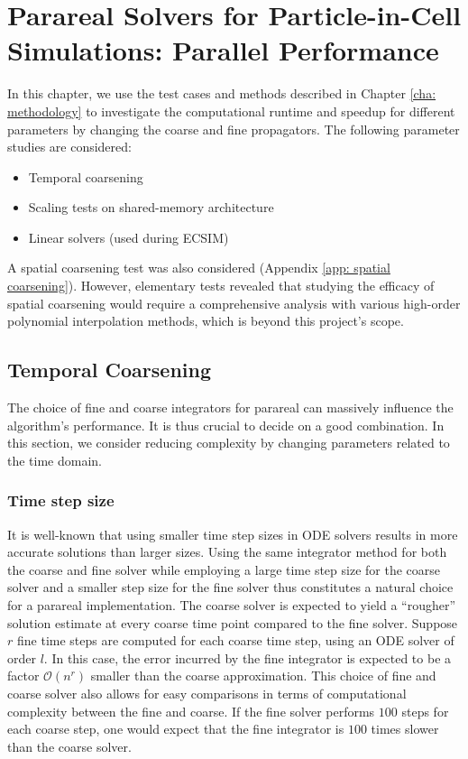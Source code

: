 \chapter{Parareal Solvers for Particle-in-Cell Simulations: Parallel Performance}
\label{cha: speedup}

In this chapter, we use the test cases and methods described in Chapter \ref{cha: methodology} to investigate the computational runtime and speedup for different parameters by changing the coarse and fine propagators. 
 The following parameter studies are considered: 
 \begin{itemize}
 
    \item Temporal coarsening
    
    \item Scaling tests on shared-memory architecture
    
    \item Linear solvers (used during ECSIM)
 
 \end{itemize}
A spatial coarsening test was also considered (Appendix \ref{app: spatial coarsening}). However, elementary tests revealed that studying the efficacy of spatial coarsening would require a comprehensive analysis with various high-order polynomial interpolation methods, which is beyond this project's scope. 

\section{Temporal Coarsening}
The choice of fine and coarse integrators for parareal can massively influence the algorithm's performance. It is thus crucial to decide on a good combination. In this section, we consider reducing complexity by changing parameters related to the time domain.
\subsection{Time step size}
 It is well-known that using smaller time step sizes in ODE solvers results in more accurate solutions than larger sizes. Using the same integrator method for both the coarse and fine solver while employing a large time step size for the coarse solver and a smaller step size for the fine solver thus constitutes a natural choice for a parareal implementation. The coarse solver is expected to yield a ``rougher'' solution estimate at every coarse time point compared to the fine solver. Suppose $r$ fine time steps are computed for each coarse time step, using an ODE solver of order $l$. In this case, the error incurred by the fine integrator is expected to be a factor $\mathcal{O}(n^r)$ smaller than the coarse approximation. 
This choice of fine and coarse solver also allows for easy comparisons in terms of computational complexity between the fine and coarse. If the fine solver performs $100$ steps for each coarse step, one would expect that the fine integrator is $100$ times slower than the coarse solver.

